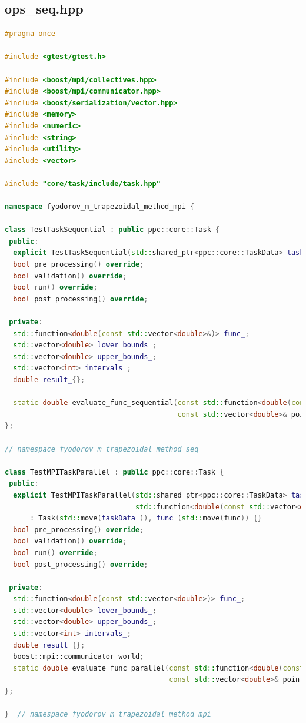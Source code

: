 \documentclass{article}
\begin{document}
\subsection{ops\_seq.hpp}
\begin{lstlisting}[language=C++]
#pragma once

#include <gtest/gtest.h>

#include <boost/mpi/collectives.hpp>
#include <boost/mpi/communicator.hpp>
#include <boost/serialization/vector.hpp>
#include <memory>
#include <numeric>
#include <string>
#include <utility>
#include <vector>

#include "core/task/include/task.hpp"

namespace fyodorov_m_trapezoidal_method_mpi {

class TestTaskSequential : public ppc::core::Task {
 public:
  explicit TestTaskSequential(std::shared_ptr<ppc::core::TaskData> taskData_) : Task(std::move(taskData_)) {}
  bool pre_processing() override;
  bool validation() override;
  bool run() override;
  bool post_processing() override;

 private:
  std::function<double(const std::vector<double>&)> func_;
  std::vector<double> lower_bounds_;
  std::vector<double> upper_bounds_;
  std::vector<int> intervals_;
  double result_{};

  static double evaluate_func_sequential(const std::function<double(const std::vector<double>&)>& func,
                                         const std::vector<double>& point);
};

// namespace fyodorov_m_trapezoidal_method_seq

class TestMPITaskParallel : public ppc::core::Task {
 public:
  explicit TestMPITaskParallel(std::shared_ptr<ppc::core::TaskData> taskData_,
                               std::function<double(const std::vector<double>&)> func)
      : Task(std::move(taskData_)), func_(std::move(func)) {}
  bool pre_processing() override;
  bool validation() override;
  bool run() override;
  bool post_processing() override;

 private:
  std::function<double(const std::vector<double>)> func_;
  std::vector<double> lower_bounds_;
  std::vector<double> upper_bounds_;
  std::vector<int> intervals_;
  double result_{};
  boost::mpi::communicator world;
  static double evaluate_func_parallel(const std::function<double(const std::vector<double>&)>& func,
                                       const std::vector<double>& point);
};

}  // namespace fyodorov_m_trapezoidal_method_mpi
\end{lstlisting}
\end{document}
